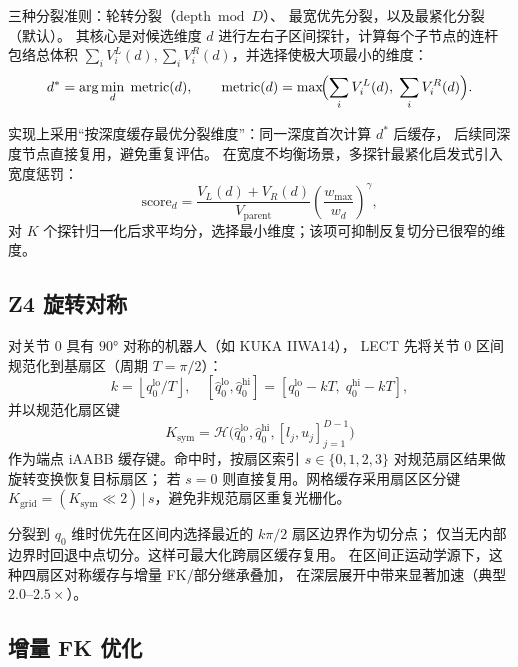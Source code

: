 \documentclass[journal]{IEEEtran}
\begin{document}
三种分裂准则：轮转分裂（$\mathrm{depth}\bmod D$）、
最宽优先分裂，以及最紧化分裂（默认）。
其核心是对候选维度 $d$ 进行左右子区间探针，计算每个子节点的连杆包络总体积
$\sum_i V_i^L(d),\sum_i V_i^R(d)$，并选择使极大项最小的维度：
\begin{equation}
  d^* = \arg\min_d\; \text{metric}(d),\qquad
  \text{metric}(d)=\max\!\Bigl(\sum_i V_i^L(d),\;\sum_i V_i^R(d)\Bigr).
\end{equation}

实现上采用“按深度缓存最优分裂维度”：同一深度首次计算 $d^*$ 后缓存，
后续同深度节点直接复用，避免重复评估。
在宽度不均衡场景，多探针最紧化启发式引入宽度惩罚：
\begin{equation}
  \text{score}_d
  = \frac{V_L(d)+V_R(d)}{V_{\text{parent}}}
    \left(\frac{w_{\max}}{w_d}\right)^{\gamma},
\end{equation}
对 $K$ 个探针归一化后求平均分，选择最小维度；该项可抑制反复切分已很窄的维度。

\subsection{Z4 旋转对称}

对关节 0 具有 $90°$ 对称的机器人（如 KUKA IIWA14），
LECT 先将关节 0 区间规范化到基扇区（周期 $T=\pi/2$）：
\begin{equation}
  k=\left\lfloor q_0^{\mathrm{lo}}/T \right\rfloor,\quad
  [\hat q_0^{\mathrm{lo}},\hat q_0^{\mathrm{hi}}]=
  [q_0^{\mathrm{lo}}-kT,\;q_0^{\mathrm{hi}}-kT],
\end{equation}
并以规范化扇区键
\begin{equation}
  K_{\mathrm{sym}}=\mathcal{H}\bigl(\hat q_0^{\mathrm{lo}},\hat q_0^{\mathrm{hi}},
  [l_j,u_j]_{j=1}^{D-1}\bigr)
\end{equation}
作为端点 iAABB 缓存键。命中时，按扇区索引 $s\in\{0,1,2,3\}$ 对规范扇区结果做旋转变换恢复目标扇区；
若 $s=0$ 则直接复用。网格缓存采用扇区区分键
$K_{\mathrm{grid}}=(K_{\mathrm{sym}}\ll 2)\,|\,s$，避免非规范扇区重复光栅化。

分裂到 $q_0$ 维时优先在区间内选择最近的 $k\pi/2$ 扇区边界作为切分点；
仅当无内部边界时回退中点切分。这样可最大化跨扇区缓存复用。
在区间正运动学源下，这种四扇区对称缓存与增量 FK/部分继承叠加，
在深层展开中带来显著加速（典型 $2.0$--$2.5{\times}$）。

\subsection{增量 FK 优化}
\end{document}
